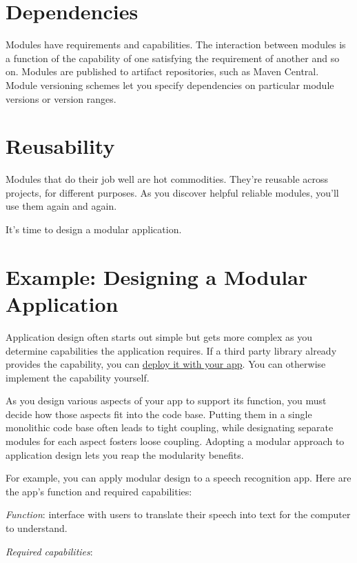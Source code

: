 \section{Dependencies}\label{dependencies}

Modules have requirements and capabilities. The interaction between
modules is a function of the capability of one satisfying the
requirement of another and so on. Modules are published to artifact
repositories, such as Maven Central. Module versioning schemes let you
specify dependencies on particular module versions or version ranges.

\section{Reusability}\label{reusability}

Modules that do their job well are hot commodities. They're reusable
across projects, for different purposes. As you discover helpful
reliable modules, you'll use them again and again.

It's time to design a modular application.

\section{Example: Designing a Modular
Application}\label{example-designing-a-modular-application}

Application design often starts out simple but gets more complex as you
determine capabilities the application requires. If a third party
library already provides the capability, you can
\href{/docs/7-2/customization/-/knowledge_base/c/adding-third-party-libraries-to-a-module}{deploy
it with your app}. You can otherwise implement the capability yourself.

As you design various aspects of your app to support its function, you
must decide how those aspects fit into the code base. Putting them in a
single monolithic code base often leads to tight coupling, while
designating separate modules for each aspect fosters loose coupling.
Adopting a modular approach to application design lets you reap the
modularity benefits.

For example, you can apply modular design to a speech recognition app.
Here are the app's function and required capabilities:

\emph{Function}: interface with users to translate their speech into
text for the computer to understand.

\emph{Required capabilities}:

